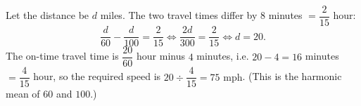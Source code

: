 Let the distance be $d$ miles. The two travel times differ by $8$ minutes $=\dfrac{2}{15}$ hour:
\[\dfrac{d}{60}-\dfrac{d}{100}=\dfrac{2}{15}\iff\dfrac{2d}{300}=\dfrac{2}{15}\iff d=20.\]
The on-time travel time is $\dfrac{20}{60}$ hour minus $4$ minutes, i.e. $20-4=16$ minutes $=\dfrac{4}{15}$ hour, so the required speed is $20\div\dfrac{4}{15}=\boxed{75\text{ mph}}$. (This is the harmonic mean of $60$ and $100$.)
